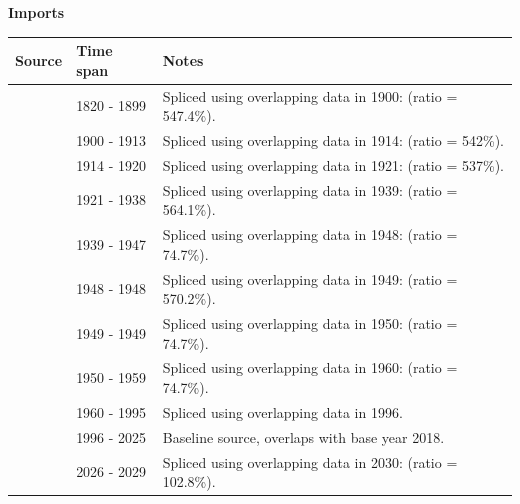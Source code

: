 \documentclass[12pt,a4paper,landscape]{article}
\begin{document}
\begin{adjustbox}{max totalsize={\paperwidth}{\paperheight},center}
\begin{minipage}[t][\textheight][t]{\textwidth}
\vspace*{0.5cm}
{}
\begin{center}
{\Large\bfseries Imports}
\end{center}
\vspace{0.5cm}
\begin{table}[H]
\centering
\small
\begin{tabular}{|l|l|l|}
\hline
\textbf{Source} & \textbf{Time span} & \textbf{Notes} \\
\hline
\rowcolor{white}\cite{Tena}& 1820 - 1899 &Spliced using overlapping data in 1900: (ratio = 547.4\%). \\
\rowcolor{lightgray}\cite{UN_trade}& 1900 - 1913 &Spliced using overlapping data in 1914: (ratio = 542\%). \\
\rowcolor{white}\cite{Tena}& 1914 - 1920 &Spliced using overlapping data in 1921: (ratio = 537\%). \\
\rowcolor{lightgray}\cite{UN_trade}& 1921 - 1938 &Spliced using overlapping data in 1939: (ratio = 564.1\%). \\
\rowcolor{white}\cite{Mitchell}& 1939 - 1947 &Spliced using overlapping data in 1948: (ratio = 74.7\%). \\
\rowcolor{lightgray}\cite{UN_trade}& 1948 - 1948 &Spliced using overlapping data in 1949: (ratio = 570.2\%). \\
\rowcolor{white}\cite{Mitchell}& 1949 - 1949 &Spliced using overlapping data in 1950: (ratio = 74.7\%). \\
\rowcolor{lightgray}\cite{UN_trade}& 1950 - 1959 &Spliced using overlapping data in 1960: (ratio = 74.7\%). \\
\rowcolor{white}\cite{WDI}& 1960 - 1995 &Spliced using overlapping data in 1996. \\
\rowcolor{lightgray}\cite{OECD_EO}& 1996 - 2025 &Baseline source, overlaps with base year 2018. \\
\rowcolor{white}\cite{IMF_WEO_forecast}& 2026 - 2029 &Spliced using overlapping data in 2030: (ratio = 102.8\%). \\
\hline
\end{tabular}
\end{table}
\begin{figure}[H]
\centering

\end{figure}
\end{minipage}
\end{adjustbox}
\end{document}
